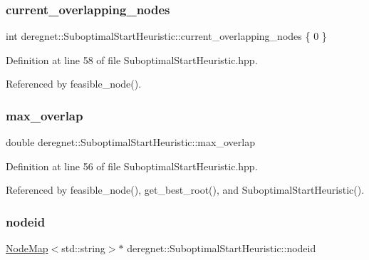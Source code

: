 \subsubsection{\texorpdfstring{current\+\_\+overlapping\+\_\+nodes}{current\_overlapping\_nodes}}
{\footnotesize\ttfamily int deregnet\+::\+Suboptimal\+Start\+Heuristic\+::current\+\_\+overlapping\+\_\+nodes \{ 0 \}\hspace{0.3cm}{\ttfamily [private]}}



Definition at line 58 of file Suboptimal\+Start\+Heuristic.\+hpp.



Referenced by feasible\+\_\+node().

\mbox{\label{classderegnet_1_1SuboptimalStartHeuristic_ab7da09c5dc0c3fd13e19d254319ab3ba}} 
\subsubsection{\texorpdfstring{max\+\_\+overlap}{max\_overlap}}
{\footnotesize\ttfamily double deregnet\+::\+Suboptimal\+Start\+Heuristic\+::max\+\_\+overlap\hspace{0.3cm}{\ttfamily [private]}}



Definition at line 56 of file Suboptimal\+Start\+Heuristic.\+hpp.



Referenced by feasible\+\_\+node(), get\+\_\+best\+\_\+root(), and Suboptimal\+Start\+Heuristic().

\mbox{\label{classderegnet_1_1SuboptimalStartHeuristic_a8928f9630eb2ffbd557e95b62c278103}} 
\subsubsection{\texorpdfstring{nodeid}{nodeid}}
{\footnotesize\ttfamily \hyperlink{namespacederegnet_ae102b707ae1d6f83c639ece5e0dd5658}{Node\+Map}$<$std\+::string$>$$\ast$ deregnet\+::\+Suboptimal\+Start\+Heuristic\+::nodeid\hspace{0.3cm}{\ttfamily [private]}}



